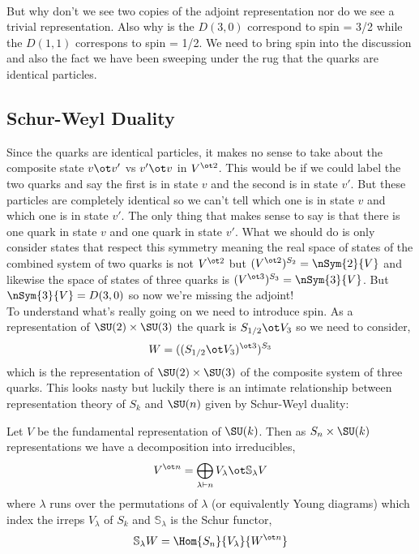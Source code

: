 \documentclass[12pt]{article}
\begin{document}
\bigskip\\
But why don't we see two copies of the adjoint representation nor do we see a trivial representation. Also why is the $D(3,0)$ correspond to spin = 3/2 while the $D(1,1)$ correspons to spin = 1/2. We need to bring spin into the discussion and also the fact we have been sweeping under the rug that the quarks are identical particles.

\subsection{Schur-Weyl Duality}

Since the quarks are identical particles, it makes no sense to take about the composite state $v \ot v'$ vs $v' \ot v$ in $V^{\ot 2}$. This would be if we could label the two quarks and say the first is in state $v$ and the second is in state $v'$. But these particles are completely identical so we can't tell which one is in state $v$ and which one is in state $v'$. The only thing that makes sense to say is that there is one quark in state $v$ and one quark in state $v'$. What we should do is only consider states that respect this symmetry meaning the real space of states of the combined system of two quarks is not $V^{\ot 2}$ but $(V^{\ot 2})^{S_2} = \nSym{2}{V}$ and likewise the space of states of three quarks is $(V^{\ot 3})^{S_3} = \nSym{3}{V}$. But $\nSym{3}{V} = D(3,0)$ so now we're missing the adjoint!
\bigskip\\
To understand what's really going on we need to introduce spin. As a representation of $\SU(2) \times \SU(3)$ the quark is $S_{1/2} \ot V_3$ so we need to consider,
\[ W = ((S_{1/2} \ot V_3)^{\ot 3})^{S_3} \]
which is the representation of $\SU(2) \times \SU(3)$ of the composite system of three quarks. This looks nasty but luckily there is an intimate relationship between representation theory of $S_k$ and $\SU(n)$ given by Schur-Weyl duality:

\renewcommand{\SS}{\mathbb{S}}
\newcommand{\alt}{\mathrm{alt}}

\begin{defn}
Let $V$ be the fundamental representation of $\SU(k)$. Then as $S_n \times \SU(k)$ representations we have a decomposition into irreducibles,
\[ V^{\ot n} = \bigoplus_{\lambda \vdash n} V_\lambda \ot \SS_\lambda V \]
where $\lambda$ runs over the permutations of $\lambda$ (or equivalently Young diagrams) which index the irreps $V_\lambda$ of $S_k$ and $\SS_\lambda$ is the Schur functor,
\[ \SS_\lambda W = \Hom{S_n}{V_\lambda}{W^{\ot n}} \]
\end{defn}
\end{document}
